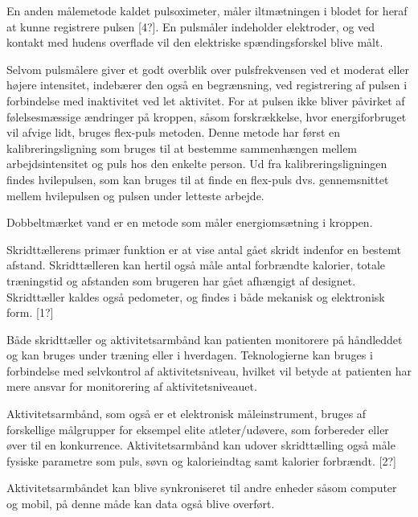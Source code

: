 En anden målemetode kaldet pulsoximeter, måler iltmætningen i blodet for heraf at kunne registrere pulsen [4?]. 
En pulsmåler indeholder elektroder, og ved kontakt med hudens overflade vil den elektriske spændingsforskel blive målt. 

Selvom pulsmålere giver et godt overblik over pulsfrekvensen ved et moderat eller højere intensitet, indebærer den også en begrænsning, ved registrering af pulsen i forbindelse med inaktivitet ved let aktivitet. 
For at pulsen ikke bliver påvirket af følelsesmæssige ændringer på kroppen, såsom forskrækkelse, hvor energiforbruget vil afvige lidt,  bruges flex-puls metoden. 
Denne metode har først en kalibreringsligning som bruges til at bestemme sammenhængen mellem arbejdsintensitet og puls hos den enkelte person. 
Ud fra kalibreringsligningen findes hvilepulsen, som kan bruges til at finde en flex-puls dvs. gennemsnittet mellem hvilepulsen og pulsen under letteste arbejde. \cite{motionsraad2007}

Dobbeltmærket vand er en metode som måler energiomsætning i kroppen. 


Skridttællerens primær funktion er at vise antal gået skridt indenfor en bestemt afstand. 
Skridttælleren kan hertil også måle antal forbrændte kalorier, totale træningstid og afstanden som brugeren har gået afhængigt af  designet. Skridttæller kaldes også pedometer, og findes i både mekanisk og elektronisk form. [1?]

Både skridttæller og aktivitetsarmbånd kan patienten monitorere på håndleddet og kan bruges under træning eller i hverdagen. 
Teknologierne kan bruges i forbindelse med selvkontrol af aktivitetsniveau, hvilket vil betyde at patienten har mere ansvar for monitorering af aktivitetsniveauet. 

Aktivitetsarmbånd, som også er et elektronisk måleinstrument, bruges af forskellige målgrupper for eksempel elite atleter/udøvere, som forbereder eller øver til en konkurrence. 
Aktivitetsarmbånd kan udover skridttælling også måle fysiske parametre som puls, søvn og kalorieindtag samt kalorier forbrændt. [2?] 

Aktivitetsarmbåndet kan blive synkroniseret til andre enheder såsom computer og mobil, på denne måde kan data også blive overført. 







